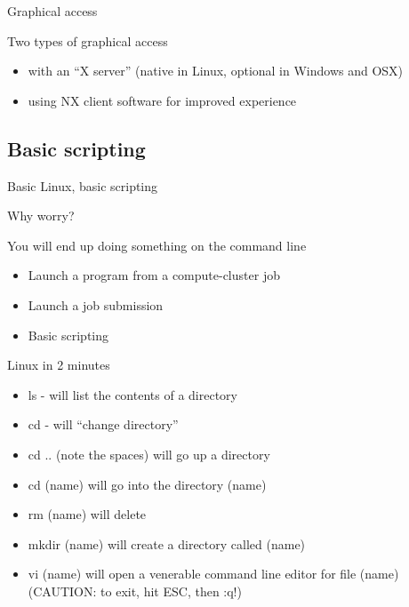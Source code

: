 \documentclass[xcolor=table,compress]{beamer}
\begin{document}
\begin{frame}{Graphical access}
\begin{block}{Two types of graphical access}
\begin{itemize}[<+->]
\item with an ``X server'' (native in Linux, optional in Windows and OSX) 
\item<3-> using NX client software for improved experience
\end{itemize}
\end{block}
\end{frame}



\subsection{Basic scripting}

\begin{frame}
Basic Linux, basic scripting
\end{frame}


\begin{frame}{Why worry?}
\begin{block}{You will end up doing something on the command line}
\begin{itemize}[<+->]
\item Launch a program from a compute-cluster job
\item Launch a job submission
\item Basic scripting
\end{itemize}
\end{block}
\end{frame}

\begin{frame}{Linux in 2 minutes}
\begin{itemize}
\item ls - will list the contents of a directory
\item cd - will ``change directory''
\item cd .. (note the spaces) will go up a directory
\item cd (name) will go into the directory (name)
\item rm (name) will delete
\item mkdir (name) will create a directory called (name)
\item vi (name) will open a venerable command line editor for file (name) \pause (CAUTION: to exit, hit ESC, then :q!)
\end{itemize}
\end{frame}
\end{document}
